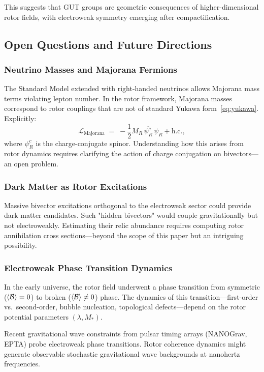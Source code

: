 \documentclass[11pt,a4paper]{article}
\newcommand{\Biv}{\mathcal{B}}
\newcommand{\Lag}{\mathcal{L}}
\theoremstyle{definition}
\theoremstyle{plain}
\theoremstyle{remark}
\begin{document}
This suggests that GUT groups are geometric consequences of higher-dimensional rotor fields, with electroweak symmetry emerging after compactification.

\subsection{Open Questions and Future Directions}

\subsubsection{Neutrino Masses and Majorana Fermions}

The Standard Model extended with right-handed neutrinos allows Majorana mass terms violating lepton number. In the rotor framework, Majorana masses correspond to rotor couplings that are not of standard Yukawa form~\eqref{eq:yukawa}. Explicitly:
\begin{equation}
  \Lag_{\text{Majorana}} \;=\; -\frac{1}{2}M_R\,\overline{\psi_R^c}\,\psi_R + \text{h.c.},
\end{equation}
where $\psi_R^c$ is the charge-conjugate spinor. Understanding how this arises from rotor dynamics requires clarifying the action of charge conjugation on bivectors---an open problem.

\subsubsection{Dark Matter as Rotor Excitations}

Massive bivector excitations orthogonal to the electroweak sector could provide dark matter candidates. Such "hidden bivectors" would couple gravitationally but not electroweakly. Estimating their relic abundance requires computing rotor annihilation cross sections---beyond the scope of this paper but an intriguing possibility.

\subsubsection{Electroweak Phase Transition Dynamics}

In the early universe, the rotor field underwent a phase transition from symmetric ($\ev{\Biv} = 0$) to broken ($\ev{\Biv} \neq 0$) phase. The dynamics of this transition---first-order vs.\ second-order, bubble nucleation, topological defects---depend on the rotor potential parameters $(\lambda, M_\ast)$.

Recent gravitational wave constraints from pulsar timing arrays (NANOGrav, EPTA) probe electroweak phase transitions. Rotor coherence dynamics might generate observable stochastic gravitational wave backgrounds at nanohertz frequencies.
\end{document}
